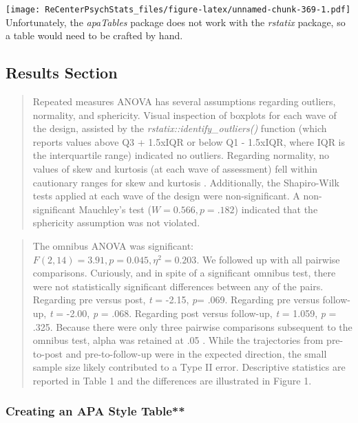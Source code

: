 \documentclass[
  11pt,
]{book}
\begin{document}
\texttt{[image: ReCenterPsychStats\_files/figure-latex/unnamed-chunk-369-1.pdf]}
Unfortunately, the \emph{apaTables} package does not work with the \emph{rstatix} package, so a table would need to be crafted by hand.

\hypertarget{results-section}{%
\subsection{Results Section}\label{results-section}}

\begin{quote}
Repeated measures ANOVA has several assumptions regarding outliers, normality, and sphericity. Visual inspection of boxplots for each wave of the design, assisted by the \emph{rstatix::identify\_outliers()} function (which reports values above Q3 + 1.5xIQR or below Q1 - 1.5xIQR, where IQR is the interquartile range) indicated no outliers. Regarding normality, no values of skew and kurtosis (at each wave of assessment) fell within cautionary ranges for skew and kurtosis \citep{kline_principles_2016}. Additionally, the Shapiro-Wilk tests applied at each wave of the design were non-significant. A non-significant Mauchley's test (\(W = 0.566, p = .182\)) indicated that the sphericity assumption was not violated.
\end{quote}

\begin{quote}
The omnibus ANOVA was significant: \(F(2,14) = 3.91, p = 0.045, \eta^2 = 0.203\). We followed up with all pairwise comparisons. Curiously, and in spite of a significant omnibus test, there were not statistically significant differences between any of the pairs. Regarding pre versus post, \emph{t} = -2.15, \emph{p}= .069. Regarding pre versus follow-up, \emph{t} = -2.00, \emph{p} = .068. Regarding post versus follow-up, \emph{t} = 1.059, \emph{p} = .325. Because there were only three pairwise comparisons subsequent to the omnibus test, alpha was retained at .05 \citep{green_using_2014}. While the trajectories from pre-to-post and pre-to-follow-up were in the expected direction, the small sample size likely contributed to a Type II error. Descriptive statistics are reported in Table 1 and the differences are illustrated in Figure 1.
\end{quote}

\hypertarget{creating-an-apa-style-table}{%
\subsubsection{Creating an APA Style Table**}\label{creating-an-apa-style-table}}
\end{document}
